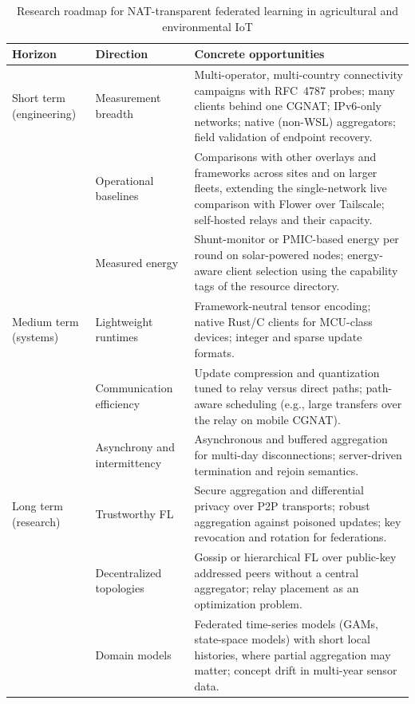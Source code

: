 \documentclass[a4paper,fleqn]{cas-dc}
\begin{document}
\begin{table}[t]
\centering
\caption{Research roadmap for NAT-transparent federated learning in agricultural and environmental IoT}
\label{tab:roadmap}
\footnotesize
\renewcommand{\arraystretch}{1.2}
\begin{tabular}{p{2.4cm} p{5.6cm} p{7.4cm}}
\toprule
\textbf{Horizon} & \textbf{Direction} & \textbf{Concrete opportunities} \\
\midrule
Short term (engineering) & Measurement breadth & Multi-operator, multi-country connectivity campaigns with RFC~4787 probes; many clients behind one CGNAT; IPv6-only networks; native (non-WSL) aggregators; field validation of endpoint recovery. \\
 & Operational baselines & Comparisons with other overlays and frameworks across sites and on larger fleets, extending the single-network live comparison with Flower over Tailscale; self-hosted relays and their capacity. \\
 & Measured energy & Shunt-monitor or PMIC-based energy per round on solar-powered nodes; energy-aware client selection using the capability tags of the resource directory. \\
\midrule
Medium term (systems) & Lightweight runtimes & Framework-neutral tensor encoding; native Rust/C clients for MCU-class devices; integer and sparse update formats. \\
 & Communication efficiency & Update compression and quantization tuned to relay versus direct paths; path-aware scheduling (e.g., large transfers over the relay on mobile CGNAT). \\
 & Asynchrony and intermittency & Asynchronous and buffered aggregation for multi-day disconnections; server-driven termination and rejoin semantics. \\
\midrule
Long term (research) & Trustworthy FL & Secure aggregation and differential privacy over P2P transports; robust aggregation against poisoned updates; key revocation and rotation for federations. \\
 & Decentralized topologies & Gossip or hierarchical FL over public-key addressed peers without a central aggregator; relay placement as an optimization problem. \\
 & Domain models & Federated time-series models (GAMs, state-space models) with short local histories, where partial aggregation may matter; concept drift in multi-year sensor data. \\
\bottomrule
\end{tabular}
\end{table}
\end{document}
